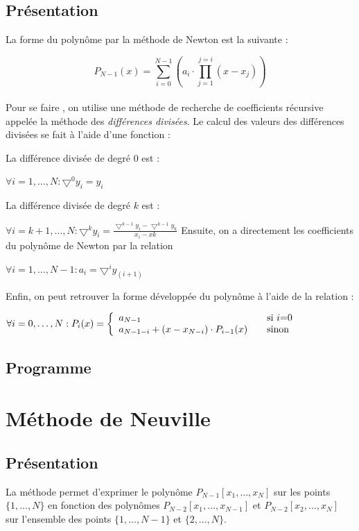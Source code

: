 \documentclass{report}
\begin{document}
      \subsection{Présentation}
	    \noindent	La forme du polynôme par la méthode de Newton est la suivante : 
    	
    	\[P_{N-1}(x)= \sum_{i=0}^{N-1} \left( a_{i} \cdot \prod_{j=1}^{j=i} (x-x_{j}) \right)\] \\
    		Pour se faire , on utilise une méthode de recherche de coefficients récursive appelée la méthode des \textit{différences divisées}. Le calcul des valeurs des différences divisées se fait à l'aide d'une fonction : 
    	
    	La différence divisée de degré $0$ est :
    	
    	
    	 $\forall i=1,\ldots, N :  \boldsymbol{\bigtriangledown}^{0}y_{i} = y_{i} $
    	 
    	 La différence divisée de degré $k$ est : 
    	 
    	 $\forall i=k+1,\ldots,N : \boldsymbol{\bigtriangledown}^{k}y_{i} = \frac{\bigtriangledown^{k-1}y_{i}-\bigtriangledown^{k-1}y_{k}}{x_{i}-x{k}}$
    	 \newline
    	 Ensuite, on a directement les coefficients du polynôme de Newton par la relation 
    	 
    	 $\forall i=1,\ldots,N-1 : a_{i} = \boldsymbol{\bigtriangledown}^{i}y_{(i+1)}$
    	 \newline
    	 
    	\noindent Enfin, on peut retrouver la forme développée du polynôme à l'aide de la relation :
    	 
    	 $\forall i=0,\ldots,N : P_{i}(x) = \left\{
  \begin{array}{l l}
    a_{N-1} & \quad \text{si $i$=0}\\
    a_{N-1-i} + (x-x_{N-i}) \cdot P_{i-1}(x) & \quad \text{sinon}
  \end{array} \right. $
      \subsection{Programme}
	
    \newpage
    \section{Méthode de Neuville}
      \subsection{Présentation}
	La méthode permet d'exprimer le polynôme $P_{N-1}[x_{1},\ldots,x_{N}]$ sur les points $\{1,\ldots,N\}$ en fonction des polynômes $P_{N-2}[x_{1},\ldots,x_{N-1}]$ et $P_{N-2}[x_{2},\ldots,x_{N}]$ sur l'ensemble des points $\{1,\ldots,N-1\}$ et $\{2,\ldots,N\}$.
	
\end{document}
